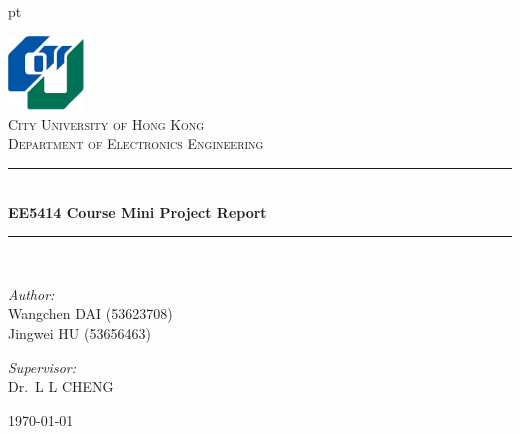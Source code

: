 \documentclass[12pt,journal,draftclsnofoot,onecolumn]{IEEEtran}
\begin{document}

 pt

\begin{titlepage}

\begin{center}


\includegraphics[width=0.15\textwidth]{./figs/logo.png}\\[1cm]    

\textsc{\LARGE City University of Hong Kong}\\[1.5cm]

\textsc{\Large Department  of Electronics Engineering}\\[0.5cm]


\rule{0.9\textwidth}{1pt}\\[0.4cm]
{ \huge \bfseries EE5414 Course Mini Project Report}\\[0.4cm]
\rule{0.9\textwidth}{1pt}\\[1.5cm]


\begin{minipage}[t]{0.4\textwidth}
\begin{flushleft} \large
\emph{Author:}\\
Wangchen \textsc{DAI} (53623708)\\
Jingwei \textsc{HU} (53656463)\\
\end{flushleft}
\end{minipage}
\begin{minipage}[t]{0.4\textwidth}
\begin{flushright} \large
\emph{Supervisor:} \\
Dr.~L L \textsc{CHENG}  
\end{flushright}
\end{minipage}

\vfill

{\large \today}

\end{center}

\end{titlepage}

\tableofcontents
{}
\clearpage
\end{document}
